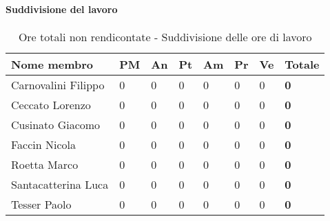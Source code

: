 			\paragraph{Suddivisione del lavoro} %
			\label{par:suddivisione_del_lavoro}
				\begin{table}[!h]
					\begin{center}
						\begin{tabularx}{0.9\textwidth}{|l|l|l|l|l|l|l|X|}
							\hline
							\textbf{Nome membro} & \textbf{PM} & \textbf{An} & \textbf{Pt} & \textbf{Am} & \textbf{Pr} & \textbf{Ve} & \textbf{Totale} \\
							\hline
							Carnovalini Filippo & 0 & 0 & 0 & 0 & 0 & 0 & \textbf{0} \\
							\hline
							Ceccato Lorenzo & 0 & 0 & 0 & 0 & 0 & 0 & \textbf{0} \\
							\hline
							Cusinato Giacomo & 0 & 0 & 0 & 0 & 0 & 0 & \textbf{0} \\
							\hline
							Faccin Nicola & 0 & 0 & 0 & 0 & 0 & 0 & \textbf{0} \\
							\hline
							Roetta Marco & 0 & 0 & 0 & 0 & 0 & 0 & \textbf{0} \\
							\hline
							Santacatterina Luca & 0 & 0 & 0 & 0 & 0 & 0 & \textbf{0} \\
							\hline
							Tesser Paolo & 0 & 0 & 0 & 0 & 0 & 0 & \textbf{0} \\
							\hline	
						\end{tabularx}
					\end{center}
				\caption{Ore totali non rendicontate - Suddivisione delle ore di lavoro}
				\end{table}
			
